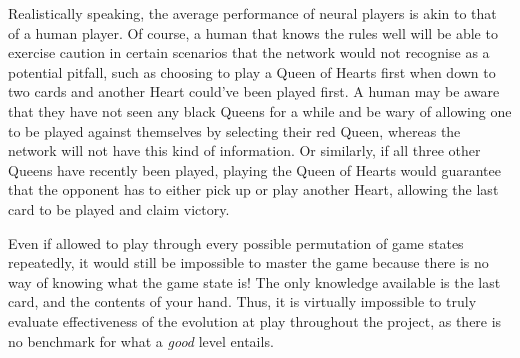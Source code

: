 \documentclass[12pt,a4paper]{article}
\begin{document}
Realistically speaking, the average performance of neural players is akin to that of a human player. Of course, a human that knows the rules well will be able to exercise caution in certain scenarios that the network would not recognise as a potential pitfall, such as choosing to play a Queen of Hearts first when down to two cards and another Heart could've been played first. A human may be aware that they have not seen any black Queens for a while and be wary of allowing one to be played against themselves by selecting their red Queen, whereas the network will not have this kind of information. Or similarly, if all three other Queens have recently been played, playing the Queen of Hearts would guarantee that the opponent has to either pick up or play another Heart, allowing the last card to be played and claim victory. 

Even if allowed to play through every possible permutation of game states repeatedly, it would still be impossible to master the game because there is no way of knowing what the game state is! The only knowledge available is the last card, and the contents of your hand. Thus, it is virtually impossible to truly evaluate effectiveness of the evolution at play throughout the project, as there is no benchmark for what a \textit{good} level entails. 

\newpage



\end{document}
